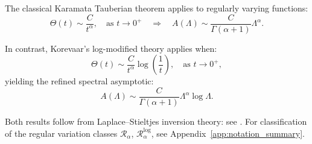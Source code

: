 \begin{remark}
\label{rem:karamata_vs_korevaar}

The classical Karamata Tauberian theorem applies to regularly varying functions:
\[
\Theta(t) \sim \frac{C}{t^\alpha}, \quad \text{as } t \to 0^+ \quad \Rightarrow \quad A(\Lambda) \sim \frac{C}{\Gamma(\alpha + 1)} \Lambda^\alpha.
\]

In contrast, Korevaar’s log-modified theory applies when:
\[
\Theta(t) \sim \frac{C}{t^\alpha} \log\left( \frac{1}{t} \right), \quad \text{as } t \to 0^+,
\]
yielding the refined spectral asymptotic:
\[
A(\Lambda) \sim \frac{C}{\Gamma(\alpha + 1)} \Lambda^\alpha \log \Lambda.
\]

Both results follow from Laplace–Stieltjes inversion theory: see \cite[Ch.~III, Thm.~3.1 and Thm.~5.5]{Korevaar2004Tauberian}. For classification of the regular variation classes \( \mathcal{R}_\alpha \), \( \mathcal{R}^{\log}_\alpha \), see Appendix~\ref{app:notation_summary}.
\end{remark}
